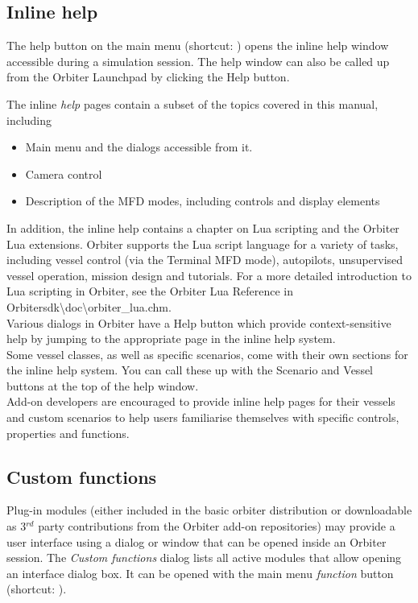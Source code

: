 \documentclass[Orbiter User Manual.tex]{subfiles}
\begin{document}
\subsection{Inline help}
The help button on the main menu (shortcut: \Ctrl{}) opens the inline help window accessible during a simulation session. The help window can also be called up from the Orbiter Launchpad by clicking the Help button.

\begin{figure}[H]
	\centering
\end{figure}

\noindent
The inline \textit{help} pages contain a subset of the topics covered in this manual, including

\begin{itemize}
\item Main menu and the dialogs accessible from it.
\item Camera control
\item Description of the MFD modes, including controls and display elements
\end{itemize}

\noindent
In addition, the inline help contains a chapter on Lua scripting and the Orbiter Lua extensions. Orbiter supports the Lua script language for a variety of tasks, including vessel control (via the Terminal MFD mode), autopilots, unsupervised vessel operation, mission design and tutorials. For a more detailed introduction to Lua scripting in Orbiter, see the Orbiter Lua Reference in Orbitersdk\textbackslash doc\textbackslash orbiter\_lua.chm.\\
Various dialogs in Orbiter have a Help button which provide context-sensitive help by jumping to the appropriate page in the inline help system.\\
Some vessel classes, as well as specific scenarios, come with their own sections for the inline help system. You can call these up with the Scenario and Vessel buttons at the top of the help window.\\
Add-on developers are encouraged to provide inline help pages for their vessels and custom scenarios to help users familiarise themselves with specific controls, properties and functions.


\subsection{Custom functions}
Plug-in modules (either included in the basic orbiter distribution or downloadable as 3$^{rd}$ party contributions from the Orbiter add-on repositories) may provide a user interface using a dialog or window that can be opened inside an Orbiter session. The \textit{Custom functions} dialog lists all active modules that allow opening an interface dialog box. It can be opened with the main menu \textit{function} button (shortcut: \Ctrl{}).
\end{document}
